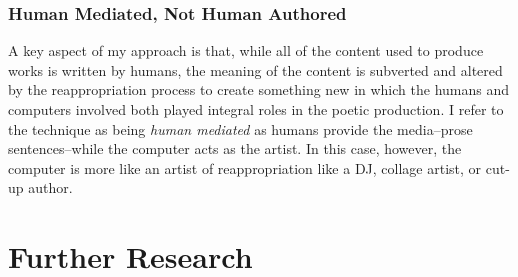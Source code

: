 \documentclass[10pt]{article}
\begin{document}
\subsubsection{Human Mediated, Not Human Authored}
A key aspect of my approach is that, while all of the content used to produce
works is written by humans, the meaning of the content is subverted and altered
by the reappropriation process to create something new in which the humans and
computers involved both played integral roles in the poetic production. I refer
to the technique as being \emph{human mediated} as humans provide the
media--prose sentences--while the computer acts as the artist. In this case,
however, the computer is more like an artist of reappropriation like a DJ,
collage artist, or cut-up author.

\section{Further Research}



\end{document}
